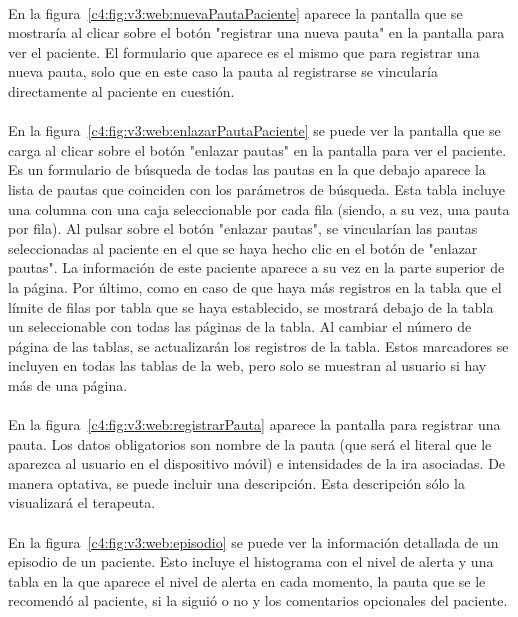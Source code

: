 \paragraph{}
En la figura~\ref{c4:fig:v3:web:nuevaPautaPaciente} aparece la pantalla que se mostraría al clicar sobre el botón "registrar una nueva pauta" en la pantalla para ver el paciente. El formulario que aparece es el mismo que para registrar una nueva pauta, solo que en este caso la pauta al registrarse se vincularía directamente al paciente en cuestión.

\paragraph{}
En la figura~\ref{c4:fig:v3:web:enlazarPautaPaciente} se puede ver la pantalla que se carga al clicar sobre el botón "enlazar pautas" en la pantalla para ver el paciente. Es un formulario de búsqueda de todas las pautas en la que debajo aparece la lista de pautas que coinciden con los parámetros de búsqueda. Esta tabla incluye una columna con una caja seleccionable por cada fila (siendo, a su vez, una pauta por fila). Al pulsar sobre el botón "enlazar pautas", se vincularían las pautas seleccionadas al paciente en el que se haya hecho clic en el botón de "enlazar pautas". La información de este paciente aparece a su vez en la parte superior de la página. Por último, como en caso de que haya más registros en la tabla que el límite de filas por tabla que se haya establecido, se mostrará debajo de la tabla un seleccionable con todas las páginas de la tabla. Al cambiar el número de página de las tablas, se actualizarán los registros de la tabla. Estos marcadores se incluyen en todas las tablas de la web, pero solo se muestran al usuario si hay más de una página.

\paragraph{}
En la figura~\ref{c4:fig:v3:web:registrarPauta} aparece la pantalla para registrar una pauta. Los datos obligatorios son nombre de la pauta (que será el literal que le aparezca al usuario en el dispositivo móvil) e intensidades de la ira asociadas. De manera optativa, se puede incluir una descripción. Esta descripción sólo la visualizará el terapeuta.

\paragraph{}
En la figura~\ref{c4:fig:v3:web:episodio} se puede ver la información detallada de un episodio de un paciente. Esto incluye el histograma con el nivel de alerta y una tabla en la que aparece el nivel de alerta en cada momento, la pauta que se le recomendó al paciente, si la siguió o no y los comentarios opcionales del paciente.

